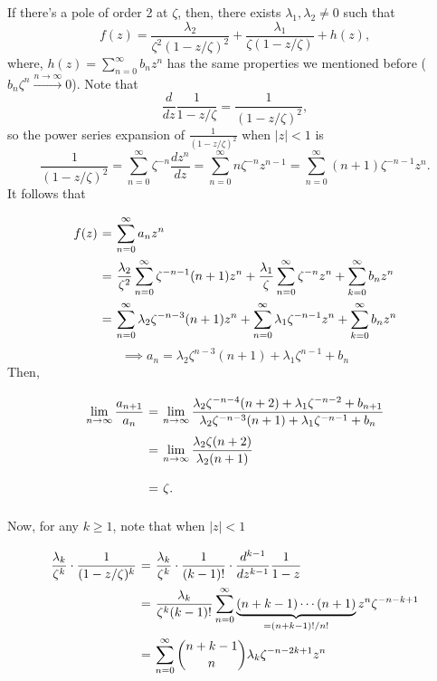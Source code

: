 If there's a pole of order 2 at $\zeta$, then, there exists $\lambda_1, \lambda_2 \neq 0$ such that
\[ f(z) = \frac{\lambda_2}{\zeta^2 (1-z/\zeta)^2} + \frac{\lambda_1}{\zeta(1-z/\zeta)} + h(z), \]
where, $h(z) = \sum_{n = 0}^{\infty} b_n z^n$ has the same properties we mentioned before ($b_n \zeta^n \overset{n \to \infty}{\to} 0$). Note that
\[ \frac{d}{dz} \frac{1}{1-z/\zeta} = \frac{1}{(1-z/\zeta)^2}, \]
so the power series expansion of $\frac{1}{(1-z/\zeta)^2}$ when $|z| < 1$ is
\[ \frac{1}{(1-z/\zeta)^2} = \sum_{n = 0}^{\infty} \zeta^{-n} \frac{d z^n}{dz}  = \sum_{n = 0}^{\infty} n \zeta^{-n} z^{n-1} =  \sum_{n = 0}^{\infty} (n+1) \zeta^{-n-1} z^{n}.\]
It follows that
\[ \everymath{\displaystyle}
\arraycolsep=1.8pt\def\arraystretch{2.5}
\begin{array}{rcl}
    f(z) & = & \sum_{n = 0}^{\infty} a_n z^n \\
    & = & \frac{\lambda_2}{\zeta^2} \sum_{n = 0}^{\infty} \zeta^{-n-1} (n+1) z^{n} + \frac{\lambda_1}{\zeta}\sum_{n = 0}^{\infty} \zeta^{-n} z^{n} + \sum_{k = 0}^{\infty}b_n z^{n}\\
    & = & \sum_{n = 0}^{\infty} \lambda_2 \zeta^{-n-3} (n+1) z^{n} + \sum_{n = 0}^{\infty} \lambda_1 \zeta^{-n-1} z^{n} + \sum_{k = 0}^{\infty}b_n z^{n}
\end{array} \]
\[ \implies a_n = \lambda_2 \zeta^{n-3} (n+1) + \lambda_1 \zeta^{n-1} + b_n \]
Then,
\[ \everymath{\displaystyle}
\arraycolsep=1.8pt\def\arraystretch{2.5}
\begin{array}{rcl}
    \lim_{n\to\infty} \frac{a_{n+1}}{a_n} 
    & = & \lim_{n\to\infty} \frac{\lambda_2 \zeta^{-n-4} (n+2)+ \lambda_1 \zeta^{-n-2} + b_{n+1}}{\lambda_2 \zeta^{-n-3} (n+1)+ \lambda_1 \zeta^{-n-1} + b_n}\\
    & = & \lim_{n\to\infty} \frac{\lambda_2 \zeta (n+2)}{\lambda_2 (n+1)}\\
    & = & \zeta.
\end{array} \]

Now, for any $k \geq 1$, note that when $|z| < 1$
\[ \everymath{\displaystyle}
\arraycolsep=1.8pt\def\arraystretch{2.5}
\begin{array}{rcl}
    \frac{\lambda_k}{\zeta^{k}} \cdot \frac{1}{(1-z/\zeta)^k} 
    & = & \frac{\lambda_k}{\zeta^{k}} \cdot \frac{1}{(k-1)!} \cdot \frac{d^{k-1}}{dz^{k-1}} \frac{1}{1-z}\\
    & = & \frac{\lambda_k}{\zeta^{k}(k-1)!} \sum_{n = 0}^{\infty} \underbrace{(n+k-1)\cdots (n+1)}_{= (n+k-1)!/n!} z^{n} \zeta^{-n-k+1}\\
    & = & \sum_{n = 0}^{\infty} \binom{n+k-1}{n}\lambda_k \zeta^{-n-2k+1} z^n
\end{array}\]

